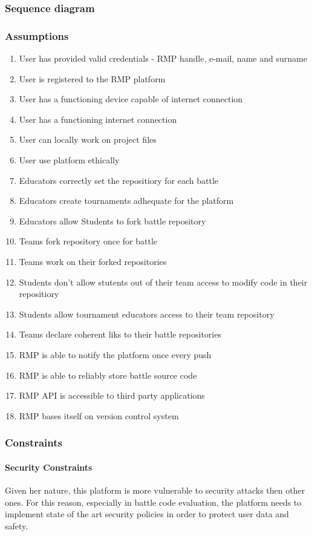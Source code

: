 \subsubsection{Sequence diagram}
\subsubsection{Assumptions}
\begin{enumerate}[label=$\bullet$ \textbf{D\arabic*:}]
    \item User has provided valid credentials - RMP handle, e-mail, name and surname
    \item User is registered to the RMP platform
    \item User has a functioning device capable of internet connection
    \item User has a functioning internet connection
    \item User can locally work on project files
    \item User use platform ethically
    \item Educators correctly set the repositiory for each battle
    \item Educators create tournaments adhequate for the platform
    \item Educators allow Students to fork battle repository
    \item Teams fork repository once for battle
    \item Teams work on their forked repositories
    \item Students don't allow stutents out of their team access to modify code in their repositiory
    \item Students allow tournament educators access to their team repository
    \item Teams declare coherent liks to their battle repositories
    \item RMP is able to notify the platform once every push
    \item RMP is able to reliably store battle source code
    \item RMP API is accessible to third party applications
    \item RMP bases itself on version control system
\end{enumerate}
\subsubsection{Constraints}
\paragraph{Security Constraints}
Given her nature, this platform is more vulnerable to security attacks then other ones. For this reason, especially in battle code evaluation, the platform needs to implement state of the art security policies in order to protect user data and safety.
